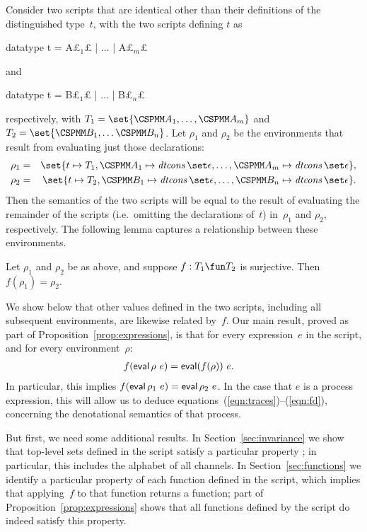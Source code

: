
Consider two scripts that are identical other than their definitions of the
distinguished type~$t$, with the two scripts defining $t$ as
\begin{cspm}
  datatype t = A£$_1$£ | ... | A£$_m$£
\end{cspm}
and 
\begin{cspm}
  datatype t = B£$_1$£ | ... | B£$_n$£
\end{cspm}
respectively, with $T_1 = \set{\M{A}_1, \ldots, \M{A}_m}$ and $T_2 =
\set{\M{B}_1, \ldots \M{B}_n}$.  Let $\rho_1$ and $\rho_2$ be the environments
that result from evaluating just those declarations:
%
\begin{eqnarray*}
\rho_1 & = & \set{t \mapsto T_1, \M A_1 \mapsto \dtcons\set\epsilon, \ldots,
   \M A_m \mapsto \dtcons\set\epsilon}, \\
\rho_2 & = & \set{t \mapsto T_2, \M B_1 \mapsto \dtcons\set\epsilon, \ldots,
   \M B_n \mapsto \dtcons\set\epsilon} .
\end{eqnarray*}
%
Then the semantics of the two scripts will be equal to the result of
evaluating the remainder of the scripts (i.e.~omitting the declarations
of~$t$) in~$\rho_1$ and $\rho_2$, respectively.
%
The following lemma captures a relationship between these environments.
%
\begin{lemma}
\label{lem:distinguished-type-declaration}
Let $\rho_1$ and $\rho_2$ be as above, and suppose $f: T_1 \fun T_2$ is
surjective.  Then $f(\rho_1) = \rho_2$.  
\end{lemma}

We show below that other values defined in the two scripts, including all
subsequent environments, are likewise related by~$f$.
%
Our main result, proved as part of Proposition~\ref{prop:expressions}, is that
for every expression~$e$ in the script, and for every environment~$\rho$:
\begin{eqnarray*}
f(\mathop{\sf eval} \rho ~ e) & = \mathop{\sf eval} (f(\rho)) ~e .
\end{eqnarray*}
%
In particular, this implies $f(\mathop{\sf eval} \rho_1 ~ e) = \mathop{\sf eval} \rho_2 ~e$.  In the
case that $e$ is a process expression, this will allow us to deduce
equations~(\ref{eqn:traces})--(\ref{eqn:fd}), concerning the denotational
semantics of that process.

But first, we need some additional results.  In Section~\ref{sec:invariance}
we show that top-level sets defined in the script satisfy a particular
property \framebox{\ldots}; in particular, this includes the alphabet of all
channels.  In Section~\ref{sec:functions} we identify a particular property of
each function defined in the script, which implies that applying~$f$ to that
function returns a function; part of Proposition~\ref{prop:expressions} shows
that all functions defined by the script do indeed satisfy this property.

